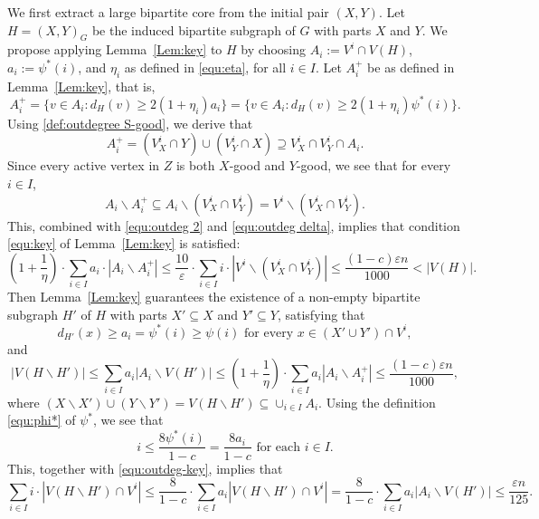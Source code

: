 \documentclass{aic}
\begin{document}
	
	We first extract a large bipartite core from the initial pair $(X,Y)$.
	Let $H=(X,Y)_G$ be the induced bipartite subgraph of $G$ with parts $X$ and $Y$.
	We propose applying Lemma~\ref{Lem:key} to $H$ by choosing $A_i := V^i \cap V(H)$, $a_i := \psi^*(i)$, and $\eta_i$ as defined in \eqref{equ:eta}, for all $i\in I$.
	Let $A_i^+$ be as defined in Lemma~\ref{Lem:key}, that is,
	$$A_i^+= \{v \in A_i : d_H(v) \geq 2(1+\eta_i)a_i\}=\{v \in A_i : d_H(v) \geq 2(1+\eta_i)\psi^*(i)\}.$$
	Using \eqref{def:outdegree S-good}, we derive that
	$$A_i^+=(V^i_X\cap Y)\cup (V^i_Y\cap X)\supseteq V^i_X\cap V^i_Y\cap A_i.$$
	Since every active vertex in $Z$ is both $X$-good and $Y$-good, we see that for every $i\in I$,
	\begin{equation*}
		A_i\backslash A_i^+\subseteq A_i\backslash (V^i_X\cap V^i_Y)=V^i\backslash (V^i_X\cap V^i_Y).
	\end{equation*}
	This, combined with \eqref{equ:outdeg 2} and \eqref{equ:outdeg delta},
	implies that condition \eqref{equ:key} of Lemma~\ref{Lem:key} is satisfied:
	\begin{equation}\label{equ:outdeg sumH}
		\left(1+\frac{1}{\eta}\right)\cdot \sum_{i\in I} a_i\cdot |A_i\backslash A_i^+|\leq \frac{10}{\varepsilon}\cdot
		\sum_{i\in I}i\cdot |V^i\backslash (V^i_X\cap V^i_Y)|\leq \frac{(1-c)\varepsilon n}{1000}<|V(H)|.
	\end{equation}
	Then Lemma~\ref{Lem:key} guarantees the existence of a non-empty bipartite subgraph $H'$ of $H$ with parts $X' \subseteq X$ and $Y' \subseteq Y$, satisfying that
	\begin{equation}
		\label{equ:outdeg d(H')}
		d_{H'}(x)\geq a_i= \psi^*(i) \geq \psi(i) \text{ for every } x\in (X'\cup Y')\cap V^i,
	\end{equation}
	and
	\begin{equation}\label{equ:outdeg-key}
		|V(H\backslash H')|\le \sum_{i\in I} a_i|A_i\backslash V(H')|\le
		\left(1+\frac{1}{\eta}\right)\cdot \sum_{i\in I} a_i |A_i\backslash A_i^+|\leq \frac{(1-c)\varepsilon n}{1000},
	\end{equation}
	where $(X\backslash X')\cup (Y\backslash Y')=V(H\backslash H')\subseteq \cup_{i\in I} A_i$.
	Using the definition \eqref{equ:phi*} of $\psi^*$, we see that
	$$i\leq \frac{8\psi^*(i)}{1-c}=\frac{8a_i}{1-c} \mbox{ for each } i\in I.$$
	This, together with \eqref{equ:outdeg-key}, implies that
	\begin{equation}
		\label{equ:outdeg 3}
		\sum_{i\in I}i\cdot |V(H\backslash H')\cap V^i|\leq \frac{8}{1-c}\cdot\sum_{i\in I}a_i |V(H\backslash H')\cap V^i|=\frac{8}{1-c}\cdot\sum_{i\in I} a_i|A_i\backslash V(H')|\le \frac{\varepsilon n}{125}.
	\end{equation}
	
\end{document}
